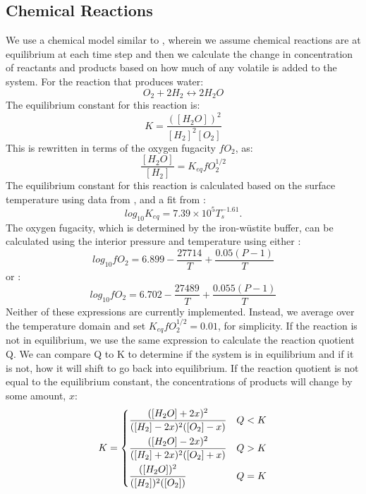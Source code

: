 \subsection{Chemical Reactions}
We use a chemical model similar to \cite{GS14}, wherein we assume chemical reactions are at equilibrium at each time step and then we calculate the change in concentration of reactants and products based on how much of any volatile is added to the system.  For the reaction that produces water:
\begin{equation}
    O_2 + 2H_2 \leftrightarrow 2H_2O
\end{equation}
The equilibrium constant for this reaction is:
\begin{equation}
    K = \frac{([H_2O])^2}{[H_2]^2[O_2]}
\end{equation}
This is rewritten in terms of the oxygen fugacity $fO_2$, as: 
\begin{equation}
    \frac{[H_2O]}{[H_2]} = K_{eq}fO_2^{1/2}
\end{equation}
The equilibrium constant for this reaction is calculated based on the surface temperature using data from \cite{RBF78}, and a fit from \cite{OS19}: 
\begin{equation}
    log_{10}K_{eq} = 7.39\times 10^5T_s^{-1.61}.
\end{equation}
The oxygen fugacity, which is determined by the iron-w\"{u}stite buffer, can be calculated using the interior pressure and temperature using either \citep{O87}: 
\begin{equation}
    log_{10}fO_2 = 6.899 - \frac{27714}{T} + \frac{0.05(P-1)}{T}
\end{equation}
or \citep{F91}:
\begin{equation}
    log_{10}fO_2 = 6.702-\frac{27489}{T} + \frac{0.055(P-1)}{T}
\end{equation}
Neither of these expressions are currently implemented. Instead, we average over the temperature domain and set $K_{eq}fO_2^{1/2} = 0.01$, for simplicity.  If the reaction is not in equilibrium, we use the same expression to calculate the reaction quotient Q. We can compare Q to K to determine if the system is in equilibrium and if it is not, how it will shift to go back into equilibrium. If the reaction quotient is not equal to the equilibrium constant, the concentrations of products will change by some amount, $x$: 
\begin{equation}\label{eq:diff}
K = 
     \begin{dcases}
        \frac{([H_2O] + 2x)^2}{([H_2] - 2x)^2([O_2] - x)} & Q < K \\
        \frac{([H_2O] - 2x)^2}{([H_2] + 2x)^2([O_2] + x)} & Q > K\\
        \frac{([H_2O])^2}{([H_2])^2([O_2])} & Q = K \\
    \end{dcases}
\end{equation}
